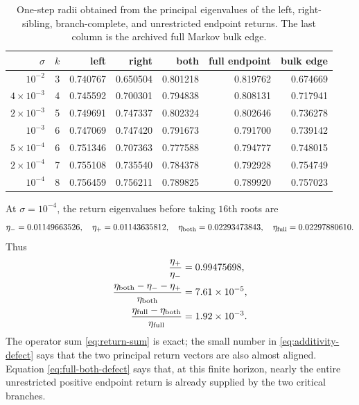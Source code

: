 \documentclass[11pt]{article}
\theoremstyle{definition}
\theoremstyle{remark}
\begin{document}
\begin{table}[H]
\centering
\scriptsize
\caption{One-step radii obtained from the principal eigenvalues of the left,
right-sibling, branch-complete, and unrestricted endpoint returns.  The last
column is the archived full Markov bulk edge.}
\label{tab:branch-radii}
\begin{tabular}{rrrrrrr}
\toprule
$\sigma$ & $k$ & left & right & both & full endpoint & bulk edge\\
\midrule
$10^{-2}$        &3&0.740767&0.650504&0.801218&0.819762&0.674669\\
$4\times10^{-3}$ &4&0.745592&0.700301&0.794838&0.808131&0.717941\\
$2\times10^{-3}$ &5&0.749691&0.747337&0.802324&0.802646&0.736278\\
$10^{-3}$        &6&0.747069&0.747420&0.791673&0.791700&0.739142\\
$5\times10^{-4}$ &6&0.751346&0.707363&0.777588&0.794777&0.748015\\
$2\times10^{-4}$ &7&0.755108&0.735540&0.784378&0.792928&0.754749\\
$10^{-4}$        &8&0.756459&0.756211&0.789825&0.789920&0.757023\\
\bottomrule
\end{tabular}
\end{table}

At $\sigma=10^{-4}$, the return eigenvalues before taking $16$th roots are
\begin{equation}\label{eq:smallest-return-values}
 \eta_-=0.01149663526,
 \quad
 \eta_+=0.01143635812,
 \quad
 \eta_{\rm both}=0.02293473843,
 \quad
 \eta_{\rm full}=0.02297880610.
\end{equation}
Thus
\begin{align}
 \frac{\eta_+}{\eta_-}&=0.99475698,
 \label{eq:right-left-ratio}\\
 \frac{\eta_{\rm both}-\eta_--\eta_+}{\eta_{\rm both}}
 &=7.61\times10^{-5},
 \label{eq:additivity-defect}\\
 \frac{\eta_{\rm full}-\eta_{\rm both}}{\eta_{\rm full}}
 &=1.92\times10^{-3}.
 \label{eq:full-both-defect}
\end{align}
The operator sum \eqref{eq:return-sum} is exact; the small number in
\eqref{eq:additivity-defect} says that the two principal return vectors are
also almost aligned.  Equation \eqref{eq:full-both-defect} says that, at this
finite horizon, nearly the entire unrestricted positive endpoint return is
already supplied by the two critical branches.
\end{document}
